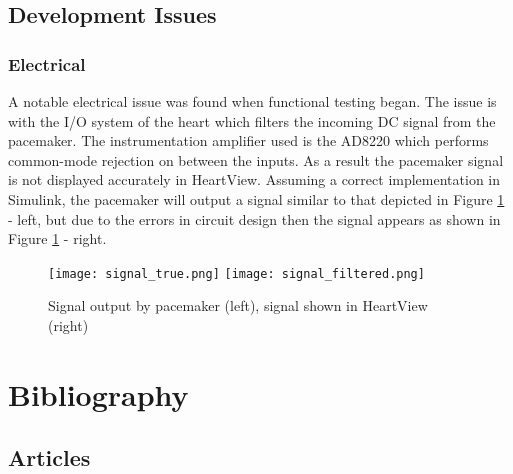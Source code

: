 \documentclass[11pt,fleqn]{book} %
\begin{document}
\section{Development Issues}

\subsection{Electrical}

A notable electrical issue was found when functional testing began. The issue is with the I/O system of the heart which filters the incoming DC signal from the pacemaker. The instrumentation amplifier used is the AD8220 which performs common-mode rejection on between the inputs. As a result the pacemaker signal is not displayed accurately in HeartView. Assuming a correct implementation in Simulink, the pacemaker will output a signal similar to that depicted in Figure \ref{fig:signal_pacemaker} - left, but due to the errors in circuit design then the signal appears as shown in Figure \ref{fig:signal_pacemaker} - right.

\begin{figure}[h]
	\centering\texttt{[image: signal\_true.png]}
	\centering\texttt{[image: signal\_filtered.png]}
	\caption{Signal output by pacemaker (left), signal shown in HeartView (right)}
	\label{fig:signal_pacemaker} %
\end{figure}



\chapter*{Bibliography}


\section*{Articles}
\printbibliography[heading=bibempty,type=article]
\end{document}
